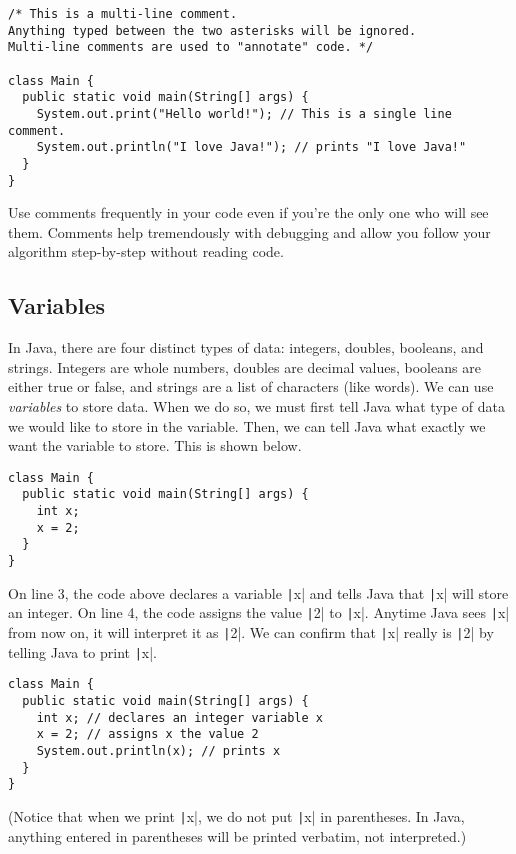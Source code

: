 \documentclass{article}
\begin{document}
\newpage

\begin{verbatim}
/* This is a multi-line comment.
Anything typed between the two asterisks will be ignored.
Multi-line comments are used to "annotate" code. */

class Main {
  public static void main(String[] args) {
    System.out.print("Hello world!"); // This is a single line comment.
    System.out.println("I love Java!"); // prints "I love Java!"
  }
}
\end{verbatim}

Use comments frequently in your code even if you're the only one who will see them. Comments help tremendously with debugging and allow you follow your algorithm step-by-step without reading code.

\subsection{Variables}
In Java, there are four distinct types of data: integers, doubles, booleans, and strings. Integers are whole numbers, doubles are decimal values, booleans are either true or false, and strings are a list of characters (like words). We can use \emph{variables} to store data. When we do so, we must first tell Java what type of data we would like to store in the variable. Then, we can tell Java what exactly we want the variable to store. This is shown below.

\begin{verbatim}
class Main {
  public static void main(String[] args) {
    int x;
    x = 2;
  }
}
\end{verbatim}

On line 3, the code above declares a variable \texttt|x| and tells Java that \texttt|x| will store an integer. On line 4, the code assigns the value \texttt|2| to \texttt|x|. Anytime Java sees \texttt|x| from now on, it will interpret it as \texttt|2|. We can confirm that \texttt|x| really is \texttt|2| by telling Java to print \texttt|x|.

\begin{verbatim}
class Main {
  public static void main(String[] args) {
    int x; // declares an integer variable x
    x = 2; // assigns x the value 2
    System.out.println(x); // prints x
  }
}
\end{verbatim}

(Notice that when we print \texttt|x|, we do not put \texttt|x| in parentheses. In Java, anything entered in parentheses will be printed verbatim, not interpreted.)
\end{document}
